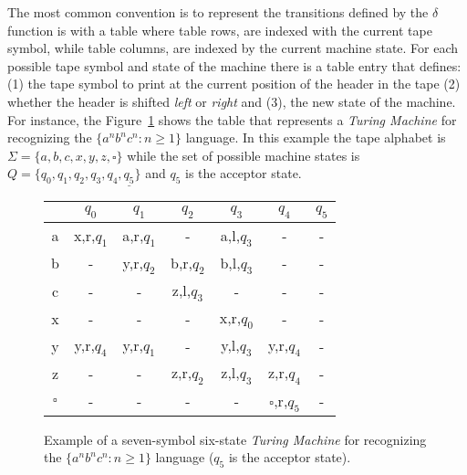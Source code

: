 \documentclass[letterpaper]{article} %
\begin{document}
The most common convention is to represent the transitions defined by the $\delta$ function is with a table where table rows, are indexed with the current tape symbol, while table columns, are indexed by the current machine state. For each possible tape symbol and state of the machine there is a table entry that defines: (1) the tape symbol to print at the current position of the header in the tape (2) whether the header is shifted {\em left} or {\em right} and (3), the new state of the machine. For instance, the Figure~\ref{tab:tm-anbncn} shows the table that represents a {\em Turing Machine} for recognizing the $\{a^nb^nc^n : n \geq 1 \}$ language. In this example the tape alphabet is $\Sigma=\{a,b,c,x,y,z,\square\}$ while the set of possible machine states is $Q=\{q_0,q_1,q_2,q_3,q_4,\underline{q_5}\}$ and \underline{$q_5$} is the acceptor state.

\begin{figure}
\begin{center}
    \begin{tabular}{| c | c | c | c | c | c | c |}
    \hline
      & $q_0$ & $q_1$ & $q_2$ & $q_3$ & $q_4$ & \underline{$q_5$} \\ \hline
    a & x,r,$q_1$ & a,r,$q_1$ & - &  a,l,$q_3$ & - & - \\ \hline
    b & - & y,r,$q_2$ & b,r,$q_2$ & b,l,$q_3$ & - & - \\ \hline
    c & - & - & z,l,$q_3$ & - & - & - \\ \hline
    x & - & - & - & x,r,$q_0$ & - & - \\ \hline
    y & y,r,$q_4$ & y,r,$q_1$ & - & y,l,$q_3$ & y,r,$q_4$ & - \\ \hline
    z & - & - & z,r,$q_2$ & z,l,$q_3$ & z,r,$q_4$ & - \\\hline
    $\square$ & - & - & - & - & $\square$,r,$q_5$  & - \\                
    \hline
    \end{tabular}
\end{center}
  \caption{\small Example of a seven-symbol six-state {\em Turing Machine} for recognizing the $\{a^nb^nc^n : n \geq 1 \}$ language (\underline{$q_5$} is the acceptor state).}
  \label{tab:tm-anbncn}
\end{figure}
\end{document}
